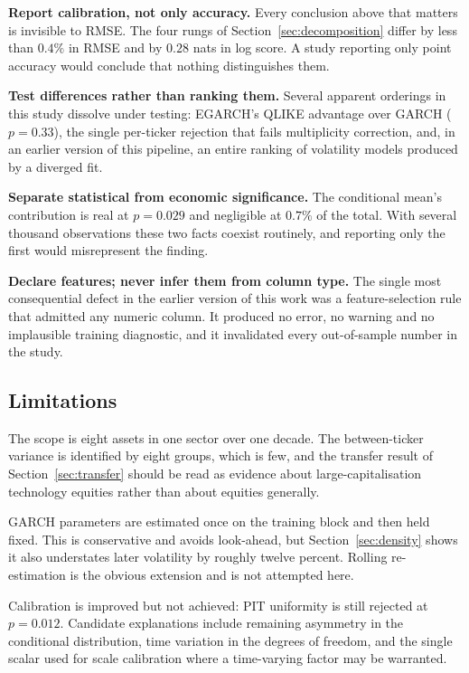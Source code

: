\textbf{Report calibration, not only accuracy.} Every conclusion above that
matters is invisible to RMSE. The four rungs of
Section~\ref{sec:decomposition} differ by less than $0.4\%$ in RMSE and by
$0.28$ nats in log score. A study reporting only point accuracy would conclude
that nothing distinguishes them.

\textbf{Test differences rather than ranking them.} Several apparent orderings
in this study dissolve under testing: EGARCH's QLIKE advantage over GARCH
($p=0.33$), the single per-ticker rejection that fails multiplicity correction,
and, in an earlier version of this pipeline, an entire ranking of volatility
models produced by a diverged fit.

\textbf{Separate statistical from economic significance.} The conditional mean's
contribution is real at $p=0.029$ and negligible at $0.7\%$ of the total. With
several thousand observations these two facts coexist routinely, and reporting
only the first would misrepresent the finding.

\textbf{Declare features; never infer them from column type.} The single most
consequential defect in the earlier version of this work was a feature-selection
rule that admitted any numeric column. It produced no error, no warning and no
implausible training diagnostic, and it invalidated every out-of-sample number
in the study.

\subsection{Limitations}

The scope is eight assets in one sector over one decade. The between-ticker
variance is identified by eight groups, which is few, and the transfer result of
Section~\ref{sec:transfer} should be read as evidence about large-capitalisation
technology equities rather than about equities generally.

GARCH parameters are estimated once on the training block and then held fixed.
This is conservative and avoids look-ahead, but Section~\ref{sec:density}
shows it also understates later volatility by roughly twelve percent. Rolling
re-estimation is the obvious extension and is not attempted here.

Calibration is improved but not achieved: PIT uniformity is still rejected at
$p=0.012$. Candidate explanations include remaining asymmetry in the conditional
distribution, time variation in the degrees of freedom, and the single scalar
used for scale calibration where a time-varying factor may be warranted.

